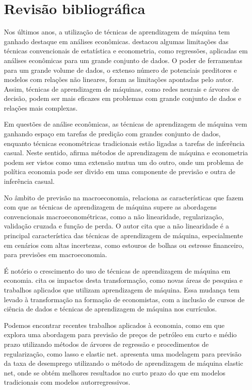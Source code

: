 \section{Revisão bibliográfica}\label{sec-revisao-bibliografica}

Nos últimos anos, a utilização de técnicas de aprendizagem de máquina tem ganhado destaque em análises econômicas.  destacou algumas limitações das técnicas convencionais de estatística e econometria, como regressões, aplicadas em análises econômicas para um grande conjunto de dados. O poder de ferramentas para um grande volume de dados, o extenso número de potenciais preditores e modelos com relações não lineares, foram as limitações apontadas pelo autor. Assim, técnicas de aprendizagem de máquinas, como redes neurais e árvores de decisão, podem ser mais eficazes em problemas com grande conjunto de dados e relações mais complexas.

Em questões de análise econômicas, as técnicas de aprendizagem de máquina vem ganhando espaço em tarefas de predição com grandes conjunto de dados, enquanto técnicas econométricas tradicionais estão ligadas a tarefas de inferência casual. Neste sentido,  afirma métodos de aprendizagem de máquina e econometria podem ser vistos como uma extensão mutua um do outro, onde um problema de política economia pode ser divido em uma componente de previsão e outra de inferência casual.

No âmbito de previsão na macroeconomia,  relaciona as características que fazem com que as técnicas de aprendizagem de máquina supere as abordagens convencionais macroeconométricas, como a não linearidade, regularização, validação cruzada e função de perda. O autor cita que a não linearidade é a principal característica das técnicas de aprendizagem de máquina, especialmente em cenários com altas incertezas, como estouros de bolhas ou estresse financeiro, para previsões em macroeconomia.

É notório o crescimento do uso de técnicas de aprendizagem de máquina em economia.  cita os impactos desta transformação, como novas áreas de pesquisa e trabalhos aplicados que utilizam aprendizagem de máquina. Essa mudança tem levado à transformação na formação de economistas, com a inclusão de cursos de ciência de dados e técnicas de aprendizagem de máquina nos currículos.

Podemos encontrar recentes trabalhos aplicados à economia, como em  que explora uma abordagem para previsão de preços de petróleo em curto e médio prazo utilizando métodos de árvores de regressão e procedimentos de regularização, como lasso e elastic net.  apresenta uma modelagem para previsão da taxa de desemprego utilizando o método de aprendizagem de máquina elastic net, onde se obtém melhores resultados no curto prazo do que em modelos tradicionais com modelos autorregressivos.

